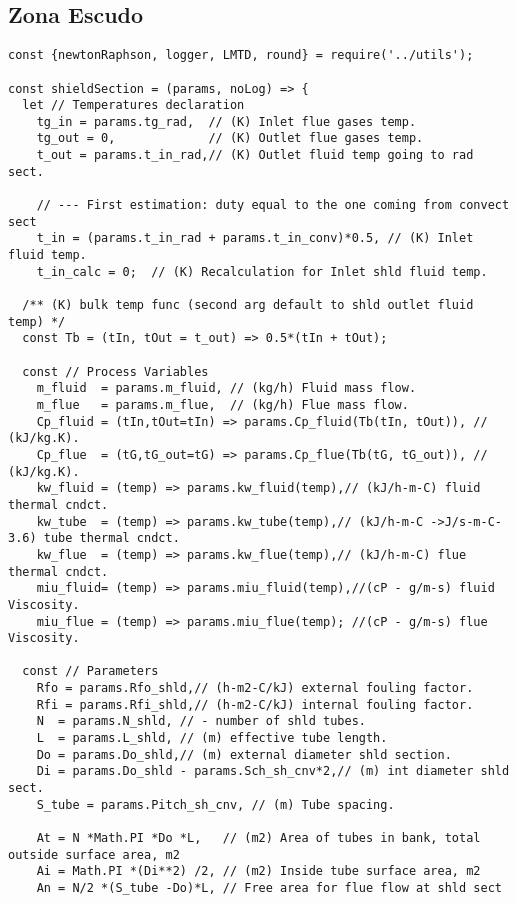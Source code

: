 \subsection{Zona Escudo}
\begin{verbatim}
const {newtonRaphson, logger, LMTD, round} = require('../utils');

const shieldSection = (params, noLog) => {
  let // Temperatures declaration
    tg_in = params.tg_rad,  // (K) Inlet flue gases temp.
    tg_out = 0,             // (K) Outlet flue gases temp.
    t_out = params.t_in_rad,// (K) Outlet fluid temp going to rad sect.

    // --- First estimation: duty equal to the one coming from convect sect
    t_in = (params.t_in_rad + params.t_in_conv)*0.5, // (K) Inlet fluid temp.
    t_in_calc = 0;  // (K) Recalculation for Inlet shld fluid temp.

  /** (K) bulk temp func (second arg default to shld outlet fluid temp) */
  const Tb = (tIn, tOut = t_out) => 0.5*(tIn + tOut);

  const // Process Variables
    m_fluid  = params.m_fluid, // (kg/h) Fluid mass flow.
    m_flue   = params.m_flue,  // (kg/h) Flue mass flow.
    Cp_fluid = (tIn,tOut=tIn) => params.Cp_fluid(Tb(tIn, tOut)), // (kJ/kg.K).
    Cp_flue  = (tG,tG_out=tG) => params.Cp_flue(Tb(tG, tG_out)), // (kJ/kg.K).
    kw_fluid = (temp) => params.kw_fluid(temp),// (kJ/h-m-C) fluid thermal cndct.
    kw_tube  = (temp) => params.kw_tube(temp),// (kJ/h-m-C ->J/s-m-C-3.6) tube thermal cndct.
    kw_flue  = (temp) => params.kw_flue(temp),// (kJ/h-m-C) flue thermal cndct.
    miu_fluid= (temp) => params.miu_fluid(temp),//(cP - g/m-s) fluid Viscosity.
    miu_flue = (temp) => params.miu_flue(temp); //(cP - g/m-s) flue Viscosity.

  const // Parameters
    Rfo = params.Rfo_shld,// (h-m2-C/kJ) external fouling factor.
    Rfi = params.Rfi_shld,// (h-m2-C/kJ) internal fouling factor.
    N  = params.N_shld, // - number of shld tubes.
    L  = params.L_shld, // (m) effective tube length.
    Do = params.Do_shld,// (m) external diameter shld section.
    Di = params.Do_shld - params.Sch_sh_cnv*2,// (m) int diameter shld sect.
    S_tube = params.Pitch_sh_cnv, // (m) Tube spacing.

    At = N *Math.PI *Do *L,   // (m2) Area of tubes in bank, total outside surface area, m2
    Ai = Math.PI *(Di**2) /2, // (m2) Inside tube surface area, m2
    An = N/2 *(S_tube -Do)*L, // Free area for flue flow at shld sect
    

\end{verbatim}
